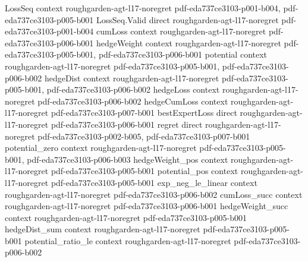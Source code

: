 \begin{theorem}
\label{hedge_no_regret}
\leanok
{}
\proofstep
  {LossSeq}
  {context}
  {roughgarden-agt-l17-noregret}
  {pdf-eda737ce3103-p001-b004,
    pdf-eda737ce3103-p005-b001}
\proofstep
  {LossSeq.Valid}
  {direct}
  {roughgarden-agt-l17-noregret}
  {pdf-eda737ce3103-p001-b004}
\proofstep
  {cumLoss}
  {context}
  {roughgarden-agt-l17-noregret}
  {pdf-eda737ce3103-p006-b001}
\proofstep
  {hedgeWeight}
  {context}
  {roughgarden-agt-l17-noregret}
  {pdf-eda737ce3103-p005-b001,
    pdf-eda737ce3103-p006-b001}
\proofstep
  {potential}
  {context}
  {roughgarden-agt-l17-noregret}
  {pdf-eda737ce3103-p005-b001,
    pdf-eda737ce3103-p006-b002}
\proofstep
  {hedgeDist}
  {context}
  {roughgarden-agt-l17-noregret}
  {pdf-eda737ce3103-p005-b001,
    pdf-eda737ce3103-p006-b002}
\proofstep
  {hedgeLoss}
  {context}
  {roughgarden-agt-l17-noregret}
  {pdf-eda737ce3103-p006-b002}
\proofstep
  {hedgeCumLoss}
  {context}
  {roughgarden-agt-l17-noregret}
  {pdf-eda737ce3103-p007-b001}
\proofstep
  {bestExpertLoss}
  {direct}
  {roughgarden-agt-l17-noregret}
  {pdf-eda737ce3103-p006-b001}
\proofstep
  {regret}
  {direct}
  {roughgarden-agt-l17-noregret}
  {pdf-eda737ce3103-p002-b005,
    pdf-eda737ce3103-p007-b001}
\proofstep
  {potential_zero}
  {context}
  {roughgarden-agt-l17-noregret}
  {pdf-eda737ce3103-p005-b001,
    pdf-eda737ce3103-p006-b003}
\proofstep
  {hedgeWeight_pos}
  {context}
  {roughgarden-agt-l17-noregret}
  {pdf-eda737ce3103-p005-b001}
\proofstep
  {potential_pos}
  {context}
  {roughgarden-agt-l17-noregret}
  {pdf-eda737ce3103-p005-b001}
\proofstep
  {exp_neg_le_linear}
  {context}
  {roughgarden-agt-l17-noregret}
  {pdf-eda737ce3103-p006-b002}
\proofstep
  {cumLoss_succ}
  {context}
  {roughgarden-agt-l17-noregret}
  {pdf-eda737ce3103-p006-b001}
\proofstep
  {hedgeWeight_succ}
  {context}
  {roughgarden-agt-l17-noregret}
  {pdf-eda737ce3103-p005-b001}
\proofstep
  {hedgeDist_sum}
  {context}
  {roughgarden-agt-l17-noregret}
  {pdf-eda737ce3103-p005-b001}
\proofstep
  {potential_ratio_le}
  {context}
  {roughgarden-agt-l17-noregret}
  {pdf-eda737ce3103-p006-b002}

\end{theorem}
